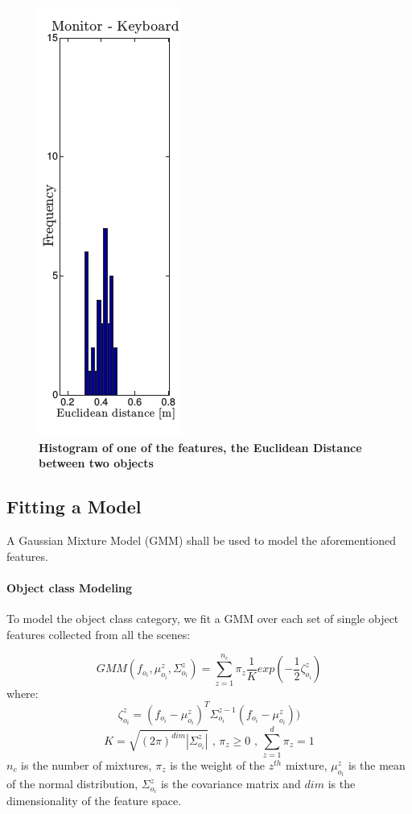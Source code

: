 \documentclass[12pt]{article}
\begin{document}
\begin{figure} [H]
\includegraphics[scale = 0.50]{histogram.png}
\centering
\caption{\textbf{Histogram of one of the features, the Euclidean Distance between two objects \cite{KTH Dataset}}}
\end{figure}


\subsection{Fitting a Model}

A Gaussian Mixture Model (GMM) shall be used to model the aforementioned features.

\paragraph{Object class Modeling}

To model the object class category, we fit a GMM over each set of single object features collected from all the scenes:

\[
GMM(f_{o_i}, \mu_{o_i}^z, \Sigma_{o_i}^z) = \sum_{z=1}^{n_c} \pi_z \frac{1}{K}
exp(-\frac{1}{2} \zeta_{o_i}^z)
\]
where: 
\[\zeta_{o_i}^z = (f_{o_i} - \mu_{o_i}^z)^T \Sigma_{o_i}^{z - 1} (f_{o_i} - \mu_{o_i}^z)) \]
\[K = \sqrt{(2\pi)^{dim}|\Sigma_{o_i}^z|} \text{   ,   } 
\pi_z \geq 0 \text{   ,   }
\sum_{z = 1}^{d}\pi_z = 1\]
$n_c$ is the number of mixtures, $\pi_z$ is the weight of the $z^{th}$ mixture, $\mu_{o_i}^z$ is the mean of the normal distribution, $\Sigma_{o_i}^z$ is the covariance matrix and $dim$ is the dimensionality of the feature space. 
\end{document}
